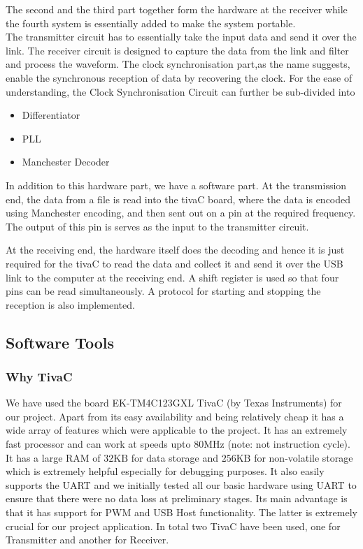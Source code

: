 \documentclass{article}
\begin{document}
The second and the third part together form the hardware at the receiver while the fourth system is essentially added to make the system portable.\\
The transmitter circuit has to essentially take the input data and send it over the link. The receiver circuit is designed to capture the data from the link and filter and process the waveform. The clock synchronisation part,as the name suggests, enable the synchronous reception of data by recovering the clock. For the ease of understanding, the Clock Synchronisation Circuit can further be sub-divided into
\begin{itemize}
\item Differentiator
\item PLL
\item Manchester Decoder
\end{itemize}

In addition to this hardware part,  we have a software part. At the transmission end, the data from a file is read into the tivaC board, where the data is encoded using Manchester encoding, and then sent out on a pin at the required frequency. The output of this pin is serves as the input to the transmitter circuit.

At the receiving end, the hardware itself does the decoding and hence it is just required for the tivaC to read the data and collect it and send it over the USB link to the computer at the receiving end. A shift register is used so that four pins can be read simultaneously. A protocol for starting and stopping the reception is also implemented. %

\subsection{Software Tools}
\subsubsection{Why TivaC}
We have used the board EK-TM4C123GXL TivaC (by Texas Instruments) for our project. Apart from its easy availability and being relatively cheap it has a wide array of features which were applicable to the project. It has an extremely fast processor and can work at speeds upto 80MHz (note: not instruction cycle). It has a large RAM of $32\text{KB}$ for data storage and $256\text{KB}$ for non-volatile storage which is extremely helpful especially for debugging purposes. It also easily supports the UART and we initially tested all our basic hardware using UART to ensure that there were no data loss at preliminary stages. Its main advantage is that it has support for PWM and USB Host functionality. The latter is extremely crucial for our project application. In total two TivaC have been used, one for Transmitter and another for Receiver.
\end{document}
